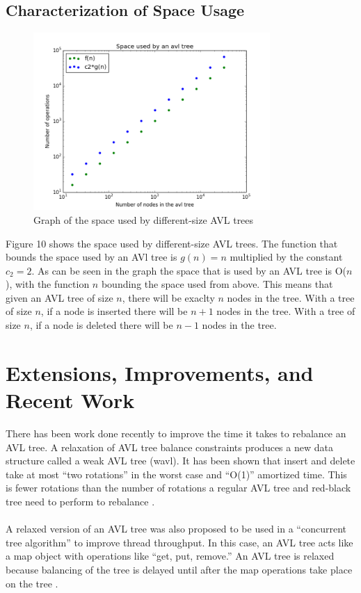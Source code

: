 \documentclass[12pt]{article}
\begin{document}
\subsection*{Characterization of Space Usage}
\begin{figure}[h]
\caption{Graph of the space used by different-size AVL trees}
\includegraphics[width=9cm]{space_used.png}
\centering
\end{figure}
\noindent
Figure 10 shows the space used by different-size AVL trees.  The function
that bounds the space used by an AVl tree is $g(n) = n$ multiplied by the
constant $c_2 = 2$.  As can be seen in the graph the space that is used by an
AVL tree is O($n$), with the function $n$ bounding the space used from above.  This means that given
an AVL tree of size $n$, there will be exaclty $n$ nodes in the tree.  With a
tree of size $n$, if a node is inserted there will be $n+1$ nodes in the tree. 
With a tree of size $n$, if a node is deleted there will be $n-1$ nodes in the
tree.

\section*{Extensions, Improvements, and Recent Work}
There has been work done recently to improve the time it takes to rebalance an
AVL tree.  A relaxation of AVL tree balance constraints produces a new data
structure called a weak AVL tree (wavl).  It has been shown that insert and delete take at
most ``two rotations'' in the worst case and ``O(1)'' amortized time.  This is
fewer rotations than the number of rotations a regular AVL tree and red-black
tree need to perform to rebalance \cite{avl-improvments}.\\
\\
A relaxed version of an AVL tree was also proposed to be used in a 
``concurrent tree algorithm'' to improve thread throughput.  In this case, an
AVL tree acts like a map object with operations like ``get, put, remove.'' 
An AVL tree is relaxed because balancing of the tree is delayed until after the 
map operations take place on the tree \cite{avl-concurrent}.

\newpage
{}



\end{document}
